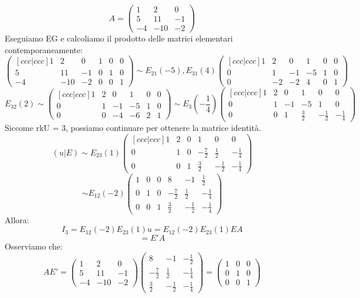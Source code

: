 \documentclass[12pt]{article}
\begin{document}
\[A = \begin{pmatrix}
    1 & 2 & 0\\
    5 & 11 & -1\\
    -4 & -10 & -2
\end{pmatrix}\]
Eseguiamo EG e calcoliamo il prodotto delle matrici elementari contemporaneamente:
\[
\begin{pmatrix}[ccc|ccc]
     1 & 2 & 0 & 1 & 0 & 0\\
    5 & 11 & -1 & 0 & 1 & 0\\
    -4 & -10 & -2 & 0 & 0 &  1
\end{pmatrix} \sim E_{21}(-5), E_{31}(4)
\begin{pmatrix}[ccc|ccc]
    1 & 2 & 0 & 1 & 0 & 0\\
    0 & 1 & -1 & -5 & 1 & 0\\
    0 & -2 & -2 & 4 & 0 & 1
\end{pmatrix}
\]
\[E_{32}(2) \sim
\begin{pmatrix}[ccc|ccc]
    1 & 2 & 0 & 1 & 0 & 0\\
    0 & 1 & -1 & -5 & 1 & 0\\
    0 & 0 & -4 & -6 & 2 & 1
\end{pmatrix} \sim  E_3\left(-\frac{1}{4}\right)
\begin{pmatrix}[ccc|ccc]
    1 & 2 & 0 & 1 & 0 & 0\\
    0 & 1 & -1 & -5 & 1 & 0\\
    0 & 0 & 1 & \frac{3}{2}& -\frac{1}{2} & -\frac{1}{4}
\end{pmatrix}
\]
Siccome rkU = 3, possiamo continuare per ottenere la matrice identità.\\
\[(u | E) \sim E_{23}(1) \begin{pmatrix}[ccc|ccc]
    1 & 2 & 0 & 1 & 0 & 0\\
    0 & 1 & 0 & -\frac{7}{2} & \frac{1}{2} & -\frac{1}{4}\\
    0 & 0 & 1 & \frac{3}{2}& -\frac{1}{2} & -\frac{1}{4}
\end{pmatrix}\]
\[\sim E_{12}(-2) \begin{pmatrix}
    1 & 0 & 0 & 8 & -1 & \frac{1}{2}\\
    0 & 1 & 0 & -\frac{7}{2} & \frac{1}{2} & -\frac{1}{4}\\
    0 & 0 & 1 & \frac{3}{2}& -\frac{1}{2} & -\frac{1}{4}
\end{pmatrix}\]
Allora: \[I_3 = E_{12}(-2)E_{23}(1)u = E_{12}(-2)E_{23}(1)EA\]
\[= E'A\]
Osserviamo che:
\[AE' = \begin{pmatrix}
    1 & 2 & 0\\
    5 & 11 & -1\\
    -4 & -10 & -2
\end{pmatrix}
\begin{pmatrix}
    8 & -1 & -\frac{1}{2}\\
    -\frac{7}{2} &  \frac{1}{2} & -\frac{1}{4}\\
    \frac{3}{2} & -\frac{1}{2} & -\frac{1}{4}
\end{pmatrix} =
\begin{pmatrix}
    1 & 0 & 0\\
    0 & 1 & 0\\
    0 & 0 & 1
\end{pmatrix}
\]
\end{document}
